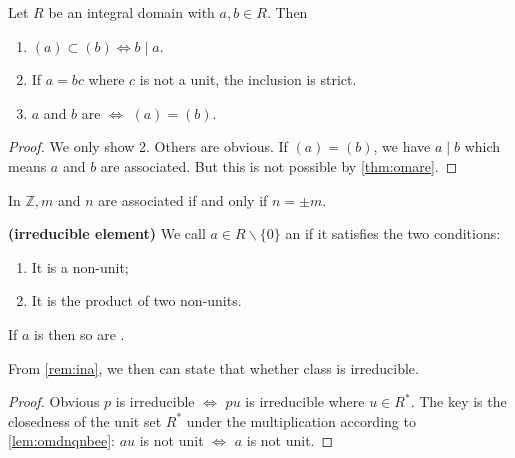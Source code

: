 \documentclass{article}
\newcommand{\bfs}[1]{\textbf{({#1}) }}
\begin{document}
\begin{lema}\label{lem:bdmmee}
 Let $R$ be an integral domain with $a, b \in R$. Then 
 \begin{enumerate}
     \item $(a) \subset(b) \Longleftrightarrow b \mid a$. 
     \item If $a=bc$ where $c$ is not a unit, the inclusion is strict.
     \item $a$ and $b$ are  $\Longleftrightarrow$ $(a)=(b)$.
 \end{enumerate}
 
\end{lema}
\begin{proof}
We only show 2. Others are obvious. If $(a)=(b)$, we have $a\mid b$ which means $a$ and $b$ are associated. But this is not possible by \cref{thm:omare}.
\end{proof}
\begin{exma}
In $\mathbb{Z}, m$ and $n$ are associated if and only if $n=\pm m$.
\end{exma}
\begin{defa}\bfs{irreducible element}
We call $a \in R \backslash\{0\}$ an  if it satisfies the two conditions:
\begin{enumerate}
    \item It is a non-unit;
    \item  It is  the product of two non-units.
\end{enumerate}
\end{defa}

\begin{lema}\label{lem:uzndd}
 If $a$ is  then so are .
\end{lema}
\begin{rema}
From \cref{rem:ina}, we then can state that whether  class is irreducible.
\end{rema}
\begin{proof}
Obvious $p$ is irreducible $\Longleftrightarrow$ $pu$ is irreducible where $u\in R^{*}$. The key is the closedness of the unit set $R^{*}$ under the multiplication according to \cref{lem:omdnqnbee}: $au$ is not unit $\Longleftrightarrow$ $a$ is not unit.
\end{proof}
\end{document}

